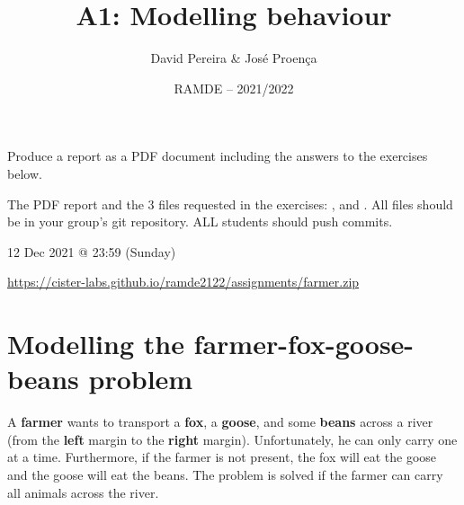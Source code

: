\documentclass[11pt]{article}
\date{RAMDE -- 2021/2022}
\begin{document}
 
 
\title{A1: Modelling behaviour}

\author{David Pereira \& Jos\'{e} Proen\c{c}a} 


\maketitle

\vspace*{-2mm}
 Produce a report as a PDF document including the answers to the exercises below.

 The PDF report and the 3 files requested in the exercises: ,  and . All files should be in your group's git repository. ALL students should push commits.

 12 Dec 2021 @ 23:59 (Sunday) %

 \url{https://cister-labs.github.io/ramde2122/assignments/farmer.zip}


\section*{Modelling the farmer-fox-goose-beans problem}

A \textbf{farmer} wants to transport a \textbf{fox}, a \textbf{goose}, and some \textbf{beans} across a river (from the \textbf{left} margin to the \textbf{right} margin).
Unfortunately, he can only carry one at a time. Furthermore, if the farmer is not present, the fox will eat the goose and the goose will eat the beans. The problem is solved if the farmer can carry all animals across the river.

\vspace*{-3mm}

\end{document}

